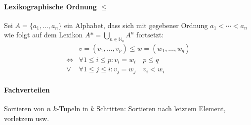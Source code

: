 \documentclass[uniLeipzig]{merkzettel}
\begin{document}
\begin{mzImportant}
  \paragraph{Lexikographische Ordnung $\mathbf{\leq}$}
  Sei $A = \{ a_1, \dots, a_n \}$ ein Alphabet, dass sich mit gegebener Ordnung $a_1 < \cdots < a_n$ wie folgt auf dem Lexikon $A* = \bigcup_{n \in \mathbb{N}_0} A^n$ fortsetzt:
  \begin{align*}
                    & v = (v_1, \dots, v_p) \leq w = (w_1, \dots, w_q)   \\
    \Leftrightarrow & \forall 1 \leq i \leq p: v_i = w_i \quad p \leq q  \\
    \lor            & \forall 1 \leq j \leq i: v_j = w_j \quad v_i < w_i
  \end{align*}

  \paragraph{Fachverteilen}
  Sortieren von $n$ $k$-Tupeln in $k$ Schritten: Sortieren nach letztem Element, vorletzem usw.
\end{mzImportant}
\end{document}
